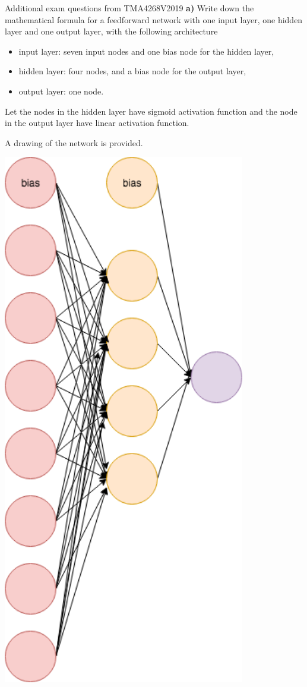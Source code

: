 \documentclass[
  ignorenonframetext,
]{beamer}
\providecommand{\tightlist}{%
  \setlength{\itemsep}{0pt}\setlength{\parskip}{0pt}}
\begin{document}
\begin{frame}
\begin{block}{Additional exam questions from TMA4268V2019}
\protect\hypertarget{additional-exam-questions-from-tma4268v2019}{}
\textbf{a)} Write down the mathematical formula for a feedforward
network with one input layer, one hidden layer and one output layer,
with the following architecture

\begin{itemize}
\tightlist
\item
  input layer: seven input nodes and one bias node for the hidden layer,
\item
  hidden layer: four nodes, and a bias node for the output layer,
\item
  output layer: one node.
\end{itemize}

Let the nodes in the hidden layer have sigmoid activation function and
the node in the output layer have linear activation function.

A drawing of the network is provided.

\includegraphics[width=300pt]{nn741}


\end{block}
\end{frame}
\end{document}

